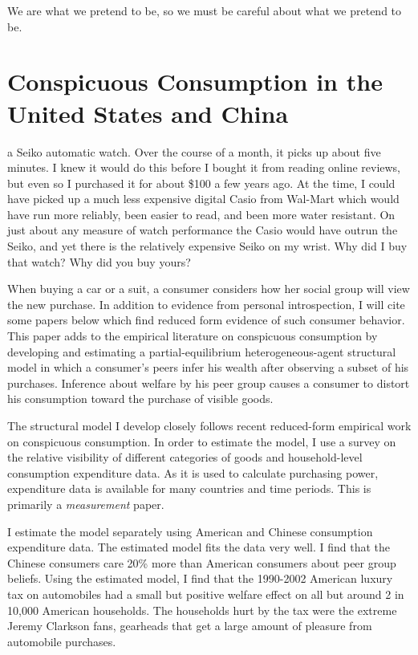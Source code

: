 \begin{savequote}[75mm]
We are what we pretend to be, so we must be careful about what we pretend to be.
\end{savequote}

\chapter{Conspicuous Consumption in the United States and China}

 a Seiko automatic watch.  Over the course of a month, it picks up about five minutes.  I knew it would do this before I bought it from reading online reviews, but even so I purchased it for about \$100 a few years ago.  At the time, I could have picked up a much less expensive digital Casio from Wal-Mart which would have run more reliably, been easier to read, and been more water resistant.  On just about any measure of watch performance the Casio would have outrun the Seiko, and yet there is the relatively expensive Seiko on my wrist.  Why did I buy that watch?  Why did you buy yours? 

When buying a car or a suit, a consumer considers how her social group will view the new purchase.  In addition to evidence from personal introspection, I will cite some papers below which find reduced form evidence of such consumer behavior. This paper adds to the empirical literature on conspicuous consumption by developing and estimating a partial-equilibrium heterogeneous-agent structural model in which a consumer's peers infer his wealth after observing a subset of his purchases.  Inference about welfare by his peer group causes a consumer to distort his consumption toward the purchase of visible goods.

The structural model I develop closely follows recent reduced-form empirical work on conspicuous consumption. \citep{Heffetz2011}  In order to estimate the model, I use a survey on the relative visibility of different categories of goods and household-level consumption expenditure data.  As it is used to calculate purchasing power, expenditure data is available for many countries and time periods.  This is primarily a \emph{measurement} paper.

I estimate the model separately using American and Chinese consumption expenditure data.  The estimated model fits the data very well.  I find that the Chinese consumers care 20\% more than American consumers about peer group beliefs.  Using the estimated model, I find that the 1990-2002 American luxury tax on automobiles had a small but positive welfare effect on all but around 2 in 10,000 American households.  The households hurt by the tax were the extreme Jeremy Clarkson fans, gearheads that get a large amount of pleasure from automobile purchases.

